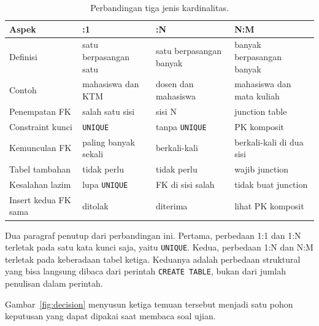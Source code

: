 \documentclass[11pt,a4paper]{article}
\begin{document}
\begin{table}[H]
	\centering
	\caption{Perbandingan tiga jenis kardinalitas.}
	\label{tab:comparison}
	\scriptsize
	\setlength{\tabcolsep}{3pt}
	\renewcommand{\arraystretch}{1.2}
	\begin{tabularx}{\textwidth}{l >{\raggedright\arraybackslash}X >{\raggedright\arraybackslash}X >{\raggedright\arraybackslash}X}
		\toprule
		Aspek & 1:1 & 1:N & N:M \\
		\midrule
		Definisi & satu berpasangan satu & satu berpasangan banyak & banyak berpasangan banyak \\
		Contoh & mahasiswa dan KTM & dosen dan mahasiswa & mahasiswa dan mata kuliah \\
		Penempatan FK & salah satu sisi & sisi N & junction table \\
		Constraint kunci & \texttt{UNIQUE} & tanpa \texttt{UNIQUE} & PK komposit \\
		Kemunculan FK & paling banyak sekali & berkali-kali & berkali-kali di dua sisi \\
		Tabel tambahan & tidak perlu & tidak perlu & wajib junction \\
		Kesalahan lazim & lupa \texttt{UNIQUE} & FK di sisi salah & tidak buat junction \\
		Insert kedua FK sama & ditolak & diterima & lihat PK komposit \\
		\bottomrule
	\end{tabularx}
\end{table}

Dua paragraf penutup dari perbandingan ini. Pertama, perbedaan 1:1 dan 1:N terletak pada satu kata kunci saja, yaitu \texttt{UNIQUE}. Kedua, perbedaan 1:N dan N:M terletak pada keberadaan tabel ketiga. Keduanya adalah perbedaan struktural yang bisa langsung dibaca dari perintah \texttt{CREATE TABLE}, bukan dari jumlah penulisan dalam perintah.

Gambar~\ref{fig:decision} menyusun ketiga temuan tersebut menjadi satu pohon keputusan yang dapat dipakai saat membaca soal ujian.
\end{document}
